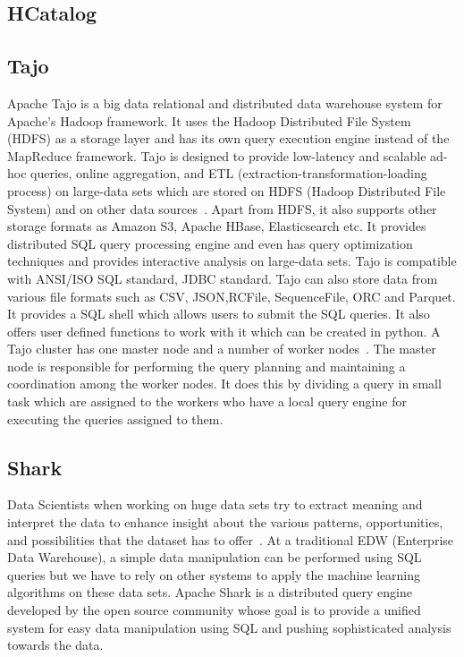 \subsection{HCatalog}

\pv 

\subsection{Tajo}

Apache Tajo is a big data relational and distributed data warehouse
system for Apache's Hadoop framework\cite{www-apache-tajo}. It uses
the Hadoop Distributed File System (HDFS) as a storage layer and has
its own query execution engine instead of the MapReduce
framework. Tajo is designed to provide low-latency and scalable ad-hoc
queries, online aggregation, and ETL
(extraction-transformation-loading process) on large-data sets which
are stored on HDFS (Hadoop Distributed File System) and on other data
sources~\cite{www-tutorialspoint-tajo}. Apart from HDFS, it also
supports other storage formats as Amazon S3, Apache HBase,
Elasticsearch etc. It provides distributed SQL query processing engine
and even has query optimization techniques and provides interactive
analysis on large-data sets. Tajo is compatible with ANSI/ISO SQL
standard, JDBC standard. Tajo can also store data from various file
formats such as CSV, JSON,RCFile, SequenceFile, ORC and Parquet. It
provides a SQL shell which allows users to submit the SQL queries. It
also offers user defined functions to work with it which can be
created in python. A Tajo cluster has one master node and a number of
worker nodes~\cite{www-tutorialspoint-tajo}. The master node is
responsible for performing the query planning and maintaining a
coordination among the worker nodes. It does this by dividing a query
in small task which are assigned to the workers who have a local query
engine for executing the queries assigned to them.

     \pv
     

\subsection{Shark}

Data Scientists when working on huge data sets try to extract meaning
and interpret the data to enhance insight about the various patterns,
opportunities, and possibilities that the dataset has to
offer~\cite{shark-paper-2012}. At a traditional EDW (Enterprise Data
Warehouse), a simple data manipulation can be performed using SQL
queries but we have to rely on other systems to apply the machine
learning algorithms on these data sets. Apache Shark is a distributed
query engine developed by the open source community whose goal is to
provide a unified system for easy data manipulation using SQL and
pushing sophisticated analysis towards the data.

